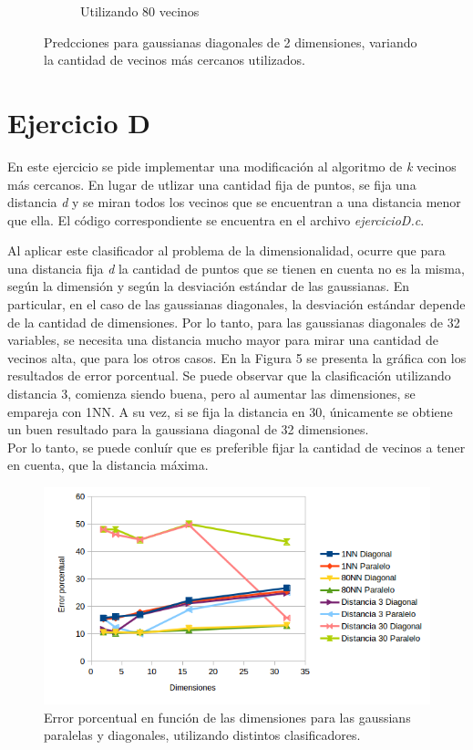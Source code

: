 \documentclass[12pt, a4paper]{article}
\begin{document}
\begin{figure}
\begin{subfigure}[b]{0.45\textwidth}
        \caption{Utilizando 80 vecinos}
    \end{subfigure}
    \caption{Predcciones para gaussianas diagonales de 2 dimensiones, variando la cantidad de vecinos más cercanos utilizados.}
\end{figure}


\section*{Ejercicio D}
En este ejercicio se pide implementar una modificación al algoritmo de \textit{k} vecinos más cercanos. En lugar de utlizar una cantidad fija de puntos, se fija una distancia \textit{d} y se miran todos los vecinos que se encuentran a una distancia menor que ella. El código correspondiente se encuentra en el archivo \textit{ejercicioD.c}.

\bigskip

Al aplicar este clasificador al problema de la dimensionalidad, ocurre que para una distancia fija \textit{d} la cantidad de puntos que se tienen en cuenta no es la misma, según la dimensión y según la desviación estándar de las gaussianas. En particular, en el caso de las gaussianas diagonales, la desviación estándar depende de la cantidad de dimensiones. Por lo tanto, para las gaussianas diagonales de 32 variables, se necesita una distancia mucho mayor para mirar una cantidad de vecinos alta, que para los otros casos. En la Figura 5 se presenta la gráfica con los resultados de error porcentual. Se puede observar que la clasificación utilizando distancia 3, comienza siendo buena, pero al aumentar las dimensiones, se empareja con 1NN. A su vez, si se fija la distancia en 30, únicamente se obtiene un buen resultado para la gaussiana diagonal de 32 dimensiones.\\
Por lo tanto, se puede conluír que es preferible fijar la cantidad de vecinos a tener en cuenta, que la distancia máxima. 

 \begin{figure}
    \centering
	\includegraphics[scale=0.8]{ejerciciod}
	\caption{Error porcentual en función de las dimensiones para las gaussians paralelas y diagonales, utilizando distintos clasificadores.}
\end{figure}
\end{document}
